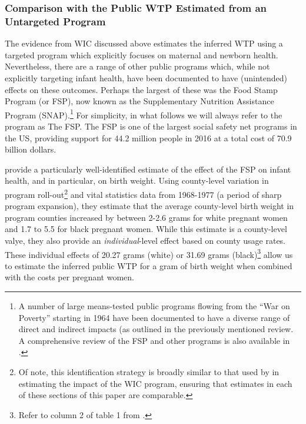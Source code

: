 \documentclass[a4paper, 11pt]{article}
\begin{document}
\begin{spacing}{1.4}
\subsubsection{Comparison with the Public WTP Estimated from an Untargeted Program}
The evidence from WIC discussed above estimates the inferred WTP using a
targeted program which explicitly focuses on maternal and newborn health.
Nevertheless, there are a range of other public programs which, while not
explicitly targeting infant health, have been documented to have (unintended)
effects on these outcomes.  Perhaps the largest of these was the Food Stamp
Program (or FSP), now known as the Supplementary Nutrition Assistance Program
(SNAP).\footnote{A number of large means-tested public programs flowing from
  the ``War on Poverty'' starting in 1964 have been documented to have a
  diverse range of direct and indirect impacts (as outlined in the previously
  mentioned \cite{BitlerKaroly2015} review.  A comprehensive review of the
  FSP and other programs is also available in \citet{BaileyDanziger2013}.}
For simplicity, in what follows we will always refer to the program as The FSP.
The FSP is one of the largest social safety net programs in the US, providing
support for 44.2 million people in 2016 at a total cost of 70.9 billion dollars.

\citet{Almondetal2011} provide a particularly well-identified estimate of the
effect of the FSP on infant health, and in particular, on birth weight.  Using
county-level variation in program roll-out\footnote{Of note, this identification
  strategy is broadly similar to that used by \citet{Hoynesetal2011} in estimating
  the impact of the WIC program, ensuring that estimates in each of these sections
  of this paper are comparable.} and vital statistics data from 1968-1977 (a
period of sharp program expansion), they estimate that the average county-level
birth weight in program counties increased by between 2-2.6 grams for white
pregnant women and 1.7 to 5.5 for black pregnant women.  While this estimate is
a county-level valye, they also provide an \emph{individual}-level effect based
on county usage rates.  These individual effects of 20.27 grams (white) or 31.69
grams (black)\footnote{Refer to column 2 of table 1 from \citet{Almondetal2011}.}
allow us to estimate the inferred public WTP for a gram of birth weight when
combined with the costs per pregnant women.


\end{spacing}
\end{document}
